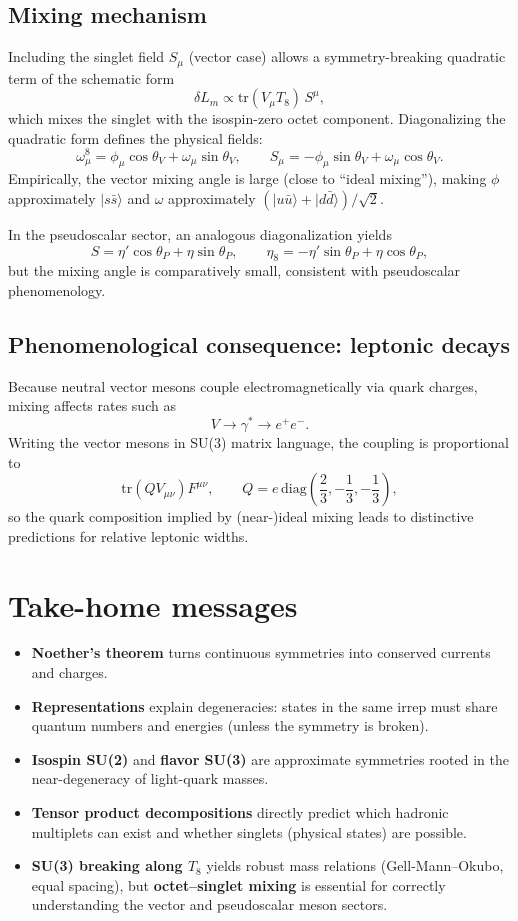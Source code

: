 \subsection{Mixing mechanism}
Including the singlet field $S_\mu$ (vector case) allows a symmetry-breaking quadratic term of the schematic form
\[
\delta L_m \propto \mathrm{tr}(V_\mu T_8)\,S^\mu,
\]
which mixes the singlet with the isospin-zero octet component. Diagonalizing the quadratic form defines the physical fields:
\[
\omega^8_\mu = \phi_\mu\cos\theta_V + \omega_\mu\sin\theta_V,
\qquad
S_\mu = -\phi_\mu\sin\theta_V + \omega_\mu\cos\theta_V.
\]
Empirically, the vector mixing angle is large (close to ``ideal mixing''), making $\phi$ approximately $|s\bar s\rangle$ and $\omega$ approximately $(|u\bar u\rangle+|d\bar d\rangle)/\sqrt{2}$.

In the pseudoscalar sector, an analogous diagonalization yields
\[
S = \eta'\cos\theta_P + \eta\sin\theta_P,
\qquad
\eta_8 = -\eta'\sin\theta_P + \eta\cos\theta_P,
\]
but the mixing angle is comparatively small, consistent with pseudoscalar phenomenology.

\subsection{Phenomenological consequence: leptonic decays}
Because neutral vector mesons couple electromagnetically via quark charges, mixing affects rates such as
\[
V \to \gamma^* \to e^+e^-.
\]
Writing the vector mesons in SU(3) matrix language, the coupling is proportional to
\[
\mathrm{tr}(Q V_{\mu\nu})F^{\mu\nu},
\qquad
Q=e\,
\mathrm{diag}\!\left(\frac23,-\frac13,-\frac13\right),
\]
so the quark composition implied by (near-)ideal mixing leads to distinctive predictions for relative leptonic widths.

\section{Take-home messages}
\begin{itemize}
  \item \textbf{Noether's theorem} turns continuous symmetries into conserved currents and charges.
  \item \textbf{Representations} explain degeneracies: states in the same irrep must share quantum numbers and energies (unless the symmetry is broken).
  \item \textbf{Isospin SU(2)} and \textbf{flavor SU(3)} are approximate symmetries rooted in the near-degeneracy of light-quark masses.
  \item \textbf{Tensor product decompositions} directly predict which hadronic multiplets can exist and whether singlets (physical states) are possible.
  \item \textbf{SU(3) breaking along $T_8$} yields robust mass relations (Gell-Mann--Okubo, equal spacing), but \textbf{octet--singlet mixing} is essential for correctly understanding the vector and pseudoscalar meson sectors.
\end{itemize}
